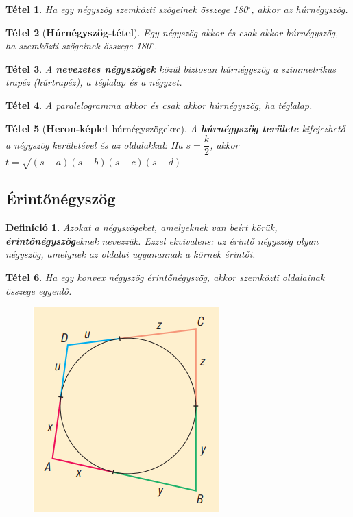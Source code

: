 \documentclass[12pt,a4paper]{article}
\newtheorem{theorem}{Tétel} [section]
\newtheorem{definition}{Definíció} [section]
\begin{document}
\begin{theorem}
Ha egy négyszög szemközti szögeinek összege 180$^\circ$, akkor az húrnégyszög.
\end{theorem}

\begin{theorem}[\textbf{Húrnégyszög-tétel}]
Egy négyszög akkor és csak akkor húrnégyszög, ha szemközti szögeinek összege 180$^\circ$.
\end{theorem}


\begin{theorem}
A \textbf{nevezetes négyszögek} közül biztosan húrnégyszög a szimmetrikus trapéz (húrtrapéz), a téglalap és a négyzet.
\end{theorem}

\begin{theorem}
A paralelogramma akkor és csak akkor húrnégyszög, ha téglalap.
\end{theorem}

\begin{theorem}[\textbf{Heron-képlet} húrnégyszögekre]
A \textbf{húrnégyszög területe} kifejezhető a négyszög kerületével és az oldalakkal: Ha $s=\dfrac{k}{2}$, akkor $t=\sqrt{(s-a)(s-b)(s-c)(s-d)}$
\end{theorem}
\newpage
\subsection{Érintőnégyszög}

\begin{definition}
Azokat a négyszögeket, amelyeknek van beírt körük, \textbf{érintőnégyszög}eknek nevezzük. Ezzel ekvivalens: az érintő négyszög olyan négyszög, amelynek az oldalai ugyanannak a körnek érintői.
\end{definition}

\begin{theorem}
Ha egy konvex négyszög érintőnégyszög, akkor szemközti oldalainak összege egyenlő.
\end{theorem}
\begin{figure}[h]
\centering
\includegraphics[scale=0.3]{geometry/erintonegyszog}
\end{figure}
\end{document}
